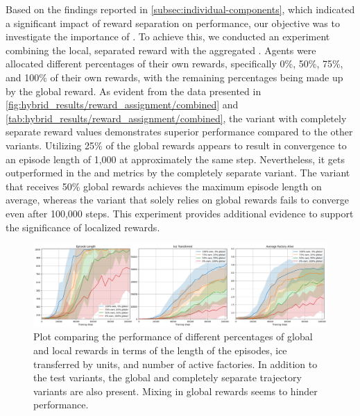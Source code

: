 \noindent Based on the findings reported in \autoref{subsec:individual-components}, which indicated a significant impact of reward separation on performance, our objective was to investigate the importance of . To achieve this, we conducted an experiment combining the local, separated reward with the aggregated . Agents were allocated different percentages of their own rewards, specifically 0\%, 50\%, 75\%, and 100\% of their own rewards, with the remaining percentages being made up by the global reward. As evident from the data presented in \autoref{fig:hybrid_results/reward_assignment/combined} and \autoref{tab:hybrid_results/reward_assignment/combined}, the variant with completely separate reward values demonstrates superior performance compared to the other variants. Utilizing 25\% of the global rewards appears to result in convergence to an episode length of 1,000 at approximately the same step. Nevertheless, it gets outperformed in the  and  metrics by the completely separate variant. The variant that receives 50\% global rewards achieves the maximum episode length on average, whereas the variant that solely relies on global rewards fails to converge even after 100,000 steps. This experiment provides additional evidence to support the significance of localized rewards.

\begin{figure}[htbp]
    \centering
    \includegraphics[width=0.95\linewidth]{images/results_hybrid/reward_assignment/combined.png}
    \captionsetup{justification=justified, singlelinecheck=false, width=1\linewidth, labelfont=bf} 
    \caption[]{Plot comparing the performance of different percentages of global and local rewards in terms of the length of the episodes, ice transferred by units, and number of active factories. In addition to the test variants, the global and completely separate trajectory variants are also present. Mixing in global rewards seems to hinder performance.}
    \label{fig:hybrid_results/reward_assignment/combined}
\end{figure}

